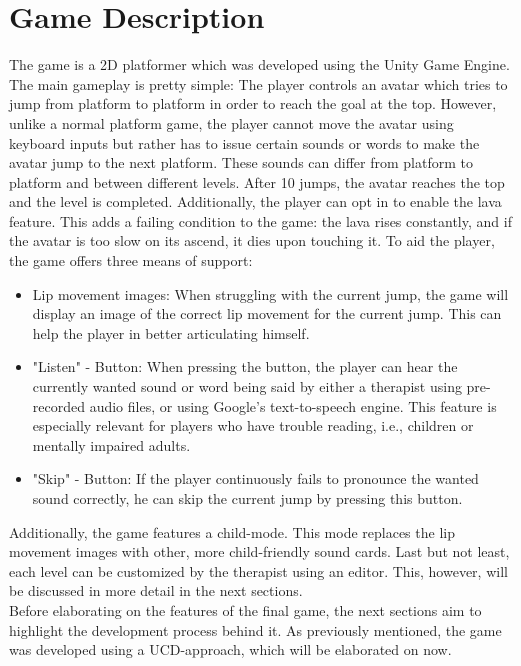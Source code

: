 \documentclass[draft,final]{vutinfth} %
\begin{document}
\section{Game Description}
The game is a 2D platformer which was developed using the Unity Game Engine. The main gameplay is pretty simple: The player controls an avatar which tries to jump from platform to platform in order to reach the goal at the top. However, unlike a normal platform game, the player cannot move the avatar using keyboard inputs but rather has to issue certain sounds or words to make the avatar jump to the next platform. These sounds can differ from platform to platform and between different levels. After 10 jumps, the avatar reaches the top and the level is completed. Additionally, the player can opt in to enable the lava feature. This adds a failing condition to the game: the lava rises constantly, and if the avatar is too slow on its ascend, it dies upon touching it.
To aid the player, the game offers three means of support:
\begin{itemize}
\item Lip movement images: When struggling with the current jump, the game will display an image of the correct lip movement for the current jump. This can help the player in better articulating himself.
\item "Listen" - Button: When pressing the button, the player can hear the currently wanted sound or word being said by either a therapist using pre-recorded audio files, or using Google's text-to-speech engine. This feature is especially relevant for players who have trouble reading, i.e., children or mentally impaired adults.
\item "Skip" - Button: If the player continuously fails to pronounce the wanted sound correctly, he can skip the current jump by pressing this button.
\end{itemize}
Additionally, the game features a child-mode. This mode replaces the lip movement images with other, more child-friendly sound cards. Last but not least, each level can be customized by the therapist using an editor. This, however, will be discussed in more detail in the next sections. 
\\
Before elaborating on the features of the final game, the next sections aim to highlight the development process behind it. As previously mentioned, the game was developed using a UCD-approach, which will be elaborated on now.
\end{document}
